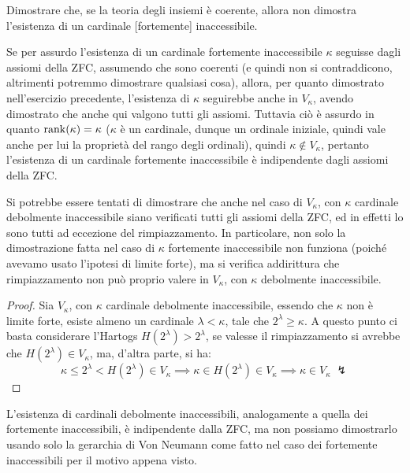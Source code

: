 \begin{exercise}
	Dimostrare che, se la teoria degli insiemi è coerente, allora non dimostra l'esistenza di un cardinale [fortemente] inaccessibile.
\end{exercise}

\begin{soln}
	Se per assurdo l'esistenza di un cardinale fortemente inaccessibile $\kappa$ seguisse dagli assiomi della ZFC, assumendo che sono coerenti (e quindi non si contraddicono, altrimenti potremmo dimostrare qualsiasi cosa), allora,
	per quanto dimostrato nell'esercizio precedente, l'esistenza di $\kappa$ seguirebbe anche in $V_\kappa$, avendo dimostrato che anche qui valgono tutti gli assiomi. Tuttavia ciò è assurdo in quanto $\operatorname{rank}(\kappa) = \kappa$ ($\kappa$ è un cardinale, dunque un ordinale iniziale, quindi vale anche per lui la proprietà del rango degli ordinali), quindi 
	$\kappa \not \in V_\kappa$, pertanto l'esistenza di un cardinale fortemente inaccessibile è indipendente dagli assiomi della ZFC.
\end{soln}

\begin{remark}
	Si potrebbe essere tentati di dimostrare che anche nel caso di $V_\kappa$, con $\kappa$ cardinale debolmente inaccessibile siano verificati tutti gli assiomi della ZFC, ed in effetti lo sono tutti ad eccezione del rimpiazzamento. In particolare, non solo la dimostrazione fatta nel caso di $\kappa$ fortemente inaccessibile non funziona (poiché avevamo usato l'ipotesi di limite forte),
	ma si verifica addirittura che rimpiazzamento non può proprio valere in $V_\kappa$, con $\kappa$ debolmente inaccessibile.
\end{remark}

\begin{proof}
	Sia $V_{\kappa}$, con $\kappa$ cardinale debolmente inaccessibile, essendo che $\kappa$ non è limite forte, esiste almeno un cardinale $\lambda < \kappa$, tale che $2^{\lambda} \geq \kappa$. A questo punto 
	ci basta considerare l'Hartogs $H(2^{\lambda}) > 2^{\lambda}$, se valesse il rimpiazzamento si avrebbe che $H(2^{\lambda}) \in V_{\kappa}$, ma, d'altra parte, si ha:
	\[ \kappa \leq 2^{\lambda} < H(2^\lambda) \in V_{\kappa} \implies \kappa \in H(2^\lambda) \in V_{\kappa} \implies \kappa \in V_{\kappa} \; \lightning
		\]
\end{proof}

\begin{remark}
	L'esistenza di cardinali debolmente inaccessibili, analogamente a quella dei fortemente inaccessibili, è indipendente dalla ZFC, ma non possiamo dimostrarlo usando solo la gerarchia di Von Neumann come fatto nel caso dei fortemente inaccessibili per il motivo appena visto.
\end{remark}